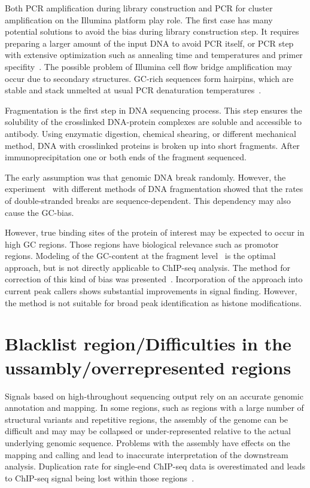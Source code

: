 Both PCR amplification during library construction and PCR for cluster amplification on the Illumina platform play role. 
The first case has many potential solutions to avoid the bias during library construction step.
It requires preparing a larger amount of the input DNA to avoid PCR itself, or PCR step with extensive optimization such as annealing time and temperatures and primer specifity~\cite{aird2011analyzing}.
The possible problem of Illumina cell flow bridge amplification may occur due to secondary structures.
GC-rich sequences form hairpins, which are stable and stack unmelted at usual PCR denaturation temperatures~\cite{stein2010nucleosome}.

Fragmentation is the first step in DNA sequencing process.
This step ensures the solubility of the crosslinked DNA-protein complexes are soluble and accessible to antibody.
Using enzymatic digestion, chemical shearing, or different mechanical method, DNA with crosslinked proteins is broken up into short fragments.
After immunoprecipitation one or both ends of the fragment sequenced.


The early assumption was that genomic DNA break randomly.
However, the experiment~\cite{poptsova2014non} with different methods of DNA fragmentation showed that the rates of double-stranded breaks are sequence-dependent.
This dependency may also cause the GC-bias. 

However, true binding sites of the protein of interest may be expected to occur in high GC regions.
Those regions have biological relevance such as promotor regions.
Modeling of the GC-content at the fragment level~\cite{benjamini2012summarizing} is the optimal approach, but is not directly applicable to ChIP-seq analysis.
The method for correction of this kind of bias was presented~\cite{teng2017accounting}.
Incorporation of the approach into current peak callers shows substantial improvements in signal finding.
However, the method is not suitable for broad peak identification as histone modifications.





\section{Blacklist region/Difficulties in the ussambly/overrepresented regions}

Signals based on high-throughout sequencing output rely on an accurate genomic annotation and mapping.
In some regions, such as regions with a large number of structural variants and repetitive regions, the assembly of the genome can be difficult and may may be collapsed or under-represented relative to the actual underlying genomic sequence.
Problems with the assembly have effects on the mapping and calling and lead to inaccurate interpretation of the downstream analysis.
Duplication rate for single-end ChIP-seq data is overestimated and leads to ChIP-seq signal being lost within those regions~\cite{chen2012systematic}.
